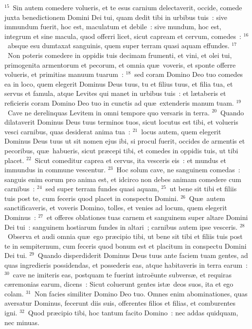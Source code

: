 ${}^{15}$~Sin autem comedere volueris, et te esus carnium delectaverit, occide, comede juxta benedictionem Domini Dei tui, quam dedit tibi in urbibus tuis~: sive immundum fuerit, hoc est, maculatum et debile~: sive mundum, hoc est, integrum et sine macula, quod offerri licet, sicut capream et cervum, comedes~:
${}^{16}$~absque esu dumtaxat sanguinis, quem super terram quasi aquam effundes.
${}^{17}$~Non poteris comedere in oppidis tuis decimam frumenti, et vini, et olei tui, primogenita armentorum et pecorum, et omnia qu\ae\ voveris, et sponte offerre volueris, et primitias manuum tuarum~:
${}^{18}$~sed coram Domino Deo tuo comedes ea in loco, quem elegerit Dominus Deus tuus, tu et filius tuus, et filia tua, et servus et famula, atque Levites qui manet in urbibus tuis~: et l\ae taberis et reficieris coram Domino Deo tuo in cunctis ad qu\ae\ extenderis manum tuam.
${}^{19}$~Cave ne derelinquas Levitem in omni tempore quo versaris in terra.
${}^{20}$~Quando dilataverit Dominus Deus tuus terminos tuos, sicut locutus est tibi, et volueris vesci carnibus, quas desiderat anima tua~:
${}^{21}$~locus autem, quem elegerit Dominus Deus tuus ut sit nomen ejus ibi, si procul fuerit, occides de armentis et pecoribus, qu\ae\ habueris, sicut pr\ae cepi tibi, et comedes in oppidis tuis, ut tibi placet.
${}^{22}$~Sicut comeditur caprea et cervus, ita vesceris eis~: et mundus et immundus in commune vescentur.
${}^{23}$~Hoc solum cave, ne sanguinem comedas~: sanguis enim eorum pro anima est, et idcirco non debes animam comedere cum carnibus~:
${}^{24}$~sed super terram fundes quasi aquam,
${}^{25}$~ut bene sit tibi et filiis tuis post te, cum feceris quod placet in conspectu Domini.
${}^{26}$~Qu\ae\ autem sanctificaveris, et voveris Domino, tolles, et venies ad locum, quem elegerit Dominus~:
${}^{27}$~et offeres oblationes tuas carnem et sanguinem super altare Domini Dei tui~: sanguinem hostiarum fundes in altari~; carnibus autem ipse vesceris.
${}^{28}$~Observa et audi omnia qu\ae\ ego pr\ae cipio tibi, ut bene sit tibi et filiis tuis post te in sempiternum, cum feceris quod bonum est et placitum in conspectu Domini Dei tui.
${}^{29}$~Quando disperdiderit Dominus Deus tuus ante faciem tuam gentes, ad quas ingredieris possidendas, et possederis eas, atque habitaveris in terra earum~:
${}^{30}$~cave ne imiteris eas, postquam te fuerint intro\"eunte subvers\ae , et requiras c\ae remonias earum, dicens~: Sicut coluerunt gentes ist\ae\ deos suos, ita et ego colam.
${}^{31}$~Non facies similiter Domino Deo tuo. Omnes enim abominationes, quas aversatur Dominus, fecerunt diis suis, offerentes filios et filias, et comburentes igni.
${}^{32}$~Quod pr\ae cipio tibi, hoc tantum facito Domino~: nec addas quidquam, nec minuas.

